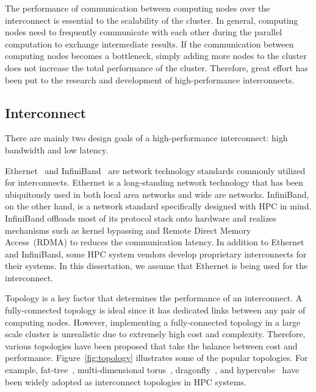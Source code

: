 The performance of communication between computing nodes over the interconnect
is essential to the scalability of the cluster. In general, computing nodes
need to frequently communicate with each other during the parallel computation
to exchange intermediate results. If the communication between computing nodes
becomes a bottleneck, simply adding more nodes to the cluster does not
increase the total performance of the cluster. Therefore, great effort has
been put to the research and development of high-performance interconnects.

\subsection{Interconnect}\label{sec:i-interconnect}

There are mainly two design goals of a high-performance interconnect: high
bandwidth and low latency.

Ethernet~\autocite{Trowbridge2007} and InfiniBand~\autocite{Buyya2001} are
network technology standards commonly utilized for interconnects. Ethernet is
a long-standing network technology that has been ubiquitously used in both
local area networks and wide are networks. InfiniBand, on the other hand, is a
network standard specifically designed with HPC in mind. InfiniBand offloads
most of its protocol stack onto hardware and realizes mechanisms such as
kernel bypassing and Remote Direct Memory Access~(RDMA) to reduces the
communication latency. In addition to Ethernet and InfiniBand, some HPC system
vendors develop proprietary interconnects for their systems. In this
dissertation, we assume that Ethernet is being used for the interconnect.

Topology is a key factor that determines the performance of an interconnect.
A fully-connected topology is ideal since it has dedicated links between any
pair of computing nodes. However, implementing a fully-connected topology in a
large scale cluster is unrealistic due to extremely high cost and complexity.
Therefore, various topologies have been proposed that take the balance
between cost and performance. Figure~\ref{fig:topology} illustrates some of
the popular topologies. For example, fat-tree~\autocite{Leiserson1985},
multi-dimensional torus~\autocite{Adiga2005,Ajima2012},
dragonfly~\autocite{Kim2008}, and hypercube~\autocite{Dally2003} have been
widely adopted as interconnect topologies in HPC systems.

